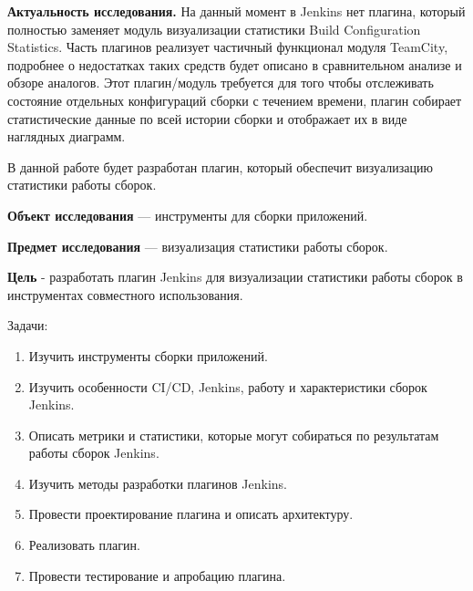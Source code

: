 \textbf{Актуальность исследования.} На данный момент в Jenkins нет плагина, который полностью заменяет модуль визуализации статистики Build Configuration Statistics. Часть плагинов реализует частичный функционал модуля TeamCity, подробнее о недостатках таких средств будет описано в сравнительном анализе и обзоре аналогов. Этот плагин/модуль требуется для того чтобы отслеживать состояние отдельных конфигураций сборки с течением времени, плагин собирает статистические данные по всей истории сборки и отображает их в виде наглядных диаграмм. 

В данной работе будет разработан плагин, который обеспечит визуализацию статистики работы сборок.

\textbf{Объект исследования} — инструменты для сборки приложений.

\textbf{Предмет исследования} — визуализация статистики работы сборок.

\textbf{Цель} - разработать плагин Jenkins для визуализации статистики работы сборок в инструментах совместного использования.

Задачи:
 
\begin{enumerate}
	\item Изучить инструменты сборки приложений.
	
	\item Изучить особенности CI/CD, Jenkins, работу и характеристики сборок Jenkins.
	
	\item Описать метрики и статистики, которые могут собираться по результатам работы сборок Jenkins.
	
	\item Изучить методы разработки плагинов Jenkins.
	
	\item Провести проектирование плагина и описать архитектуру.
	
	\item Реализовать плагин.
	
	\item Провести тестирование и апробацию плагина. 
	
\end{enumerate}




